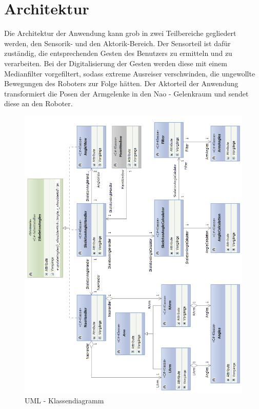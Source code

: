 %
%
\section{Architektur}\label{k:Architektur}
Die Architektur der Anwendung kann grob in zwei Teilbereiche gegliedert werden, den Sensorik- und den Aktorik-Bereich.
Der Sensorteil ist dafür zuständig, die entsprechenden Gesten des Benutzers zu ermitteln und zu verarbeiten. Bei der Digitalisierung der Gesten werden diese mit einem Medianfilter vorgefiltert, sodass extreme Ausreiser verschwinden, die ungewollte Bewegungen des Roboters zur Folge hätten.
Der Aktorteil der Anwendung transformiert die Posen der Armgelenke in den Nao - Gelenkraum und sendet diese an den Roboter.

%
%
%


\begin{figure}[H]						
	\centering							
	\includegraphics[scale=0.8]{Bilder/classdiagramm.png}
	\caption{UML - Klassendiagramm}						
	\label{f:classdiagramm}						
\end{figure}

